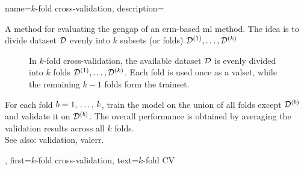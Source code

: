 {name={$k$-fold cross-validation},
 description={A method for evaluating the 
 \gls{gengap} of an \gls{erm}-based \gls{ml} method. The idea is to divide \gls{dataset} 
 $\mathcal{D}$ evenly into $k$ subsets (or folds) $\mathcal{D}^{(1)},\ldots,\mathcal{D}^{(k)}$
\begin{figure}[htbp]
	\centering
{}
\caption{In $k$-fold cross-validation, the available \gls{dataset} $\mathcal{D}$ is 
evenly divided into $k$ folds $\mathcal{D}^{(1)},\ldots,\mathcal{D}^{(k)}$. Each fold is used once as a 
\gls{valset}, while the remaining $k-1$ folds form the \gls{trainset}.		
\label{fig_kfoldcv_dict}}
\end{figure} 
		For each fold $b = 1, \,\ldots, \,k$, train the \gls{model} on the 
		union of all folds except $\mathcal{D}^{(b)}$ and validate it on 
		$\mathcal{D}^{(b)}$. The overall performance is obtained by averaging 
		the validation results across all $k$ folds.
		\\ 
		See also: \gls{validation}, \gls{valerr}.},
	first={$k$-fold cross-validation},
	text={$k$-fold CV} 
}

